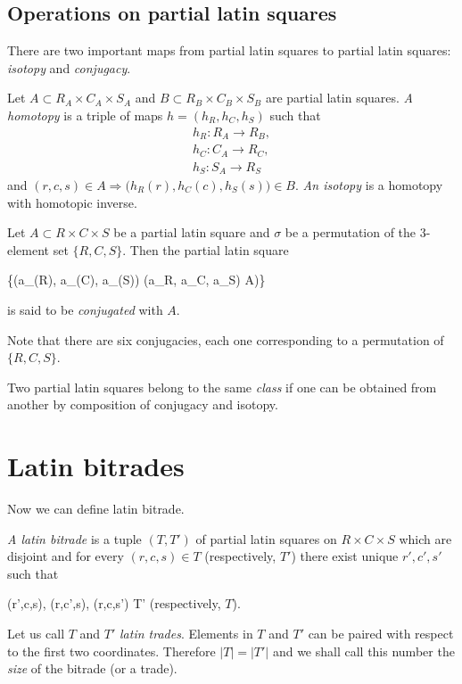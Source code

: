 \subsection{Operations on partial latin squares}

There are two important maps from partial latin squares to partial latin squares: \emph{isotopy} and \emph{conjugacy}.

\begin{defn}
Let $A \subset R_A \times C_A \times S_A$ and $B \subset R_B \times C_B \times S_B$ are partial latin squares. \emph{A homotopy} is a triple of maps $h = (h_R, h_C, h_S)$ such that
\begin{eqnarray}
	h_R : R_A \rightarrow R_B, \nonumber \\
	h_C : C_A \rightarrow R_C, \nonumber \\
	h_S : S_A \rightarrow R_S\phantom{..} \nonumber
\end{eqnarray}
and $(r,c,s) \in A \Rightarrow \big(h_R(r), h_C(c), h_S(s)\big) \in B$. \emph{An isotopy} is a homotopy with homotopic inverse.
\end{defn}


\begin{defn}
Let $A \subset R \times C \times S$ be a partial latin square and $\sigma$ be a permutation of the 3-element set $\{R,C,S\}$. Then the partial latin square
\begin{cosyeqnarray}
	\{(a_{\sigma(R)}, a_{\sigma(C)}, a_{\sigma(S)}) \mid (a_R, a_C, a_S) \in A)\}
\end{cosyeqnarray}
is said to be \emph{conjugated} with $A$.
\end{defn}

Note that there are six conjugacies, each one corresponding to a permutation of $\{R,C,S\}$.

\begin{defn}
Two partial latin squares belong to the same \emph{class} if one can be obtained from another by composition of conjugacy and isotopy.
\end{defn}


\section{Latin bitrades}

Now we can define latin bitrade.

\begin{defn}
\emph{A latin bitrade} is a tuple $(T, T')$ of partial latin squares on $R \times C \times S$ which are disjoint and for every $(r,c,s) \in T$ (respectively, $T'$) there exist unique $r', c', s'$ such that
\begin{cosyeqnarray}
	(r',c,s), (r,c',s), (r,c,s') \in T' \textrm{ (respectively, $T$)}.
\end{cosyeqnarray}%
Let us call $T$ and $T'$ \emph{latin trades}. Elements in $T$ and $T'$ can be paired with respect to the first two coordinates. Therefore $|T| = |T'|$ and we shall call this number the \emph{size} of the bitrade (or a trade).
\end{defn}

